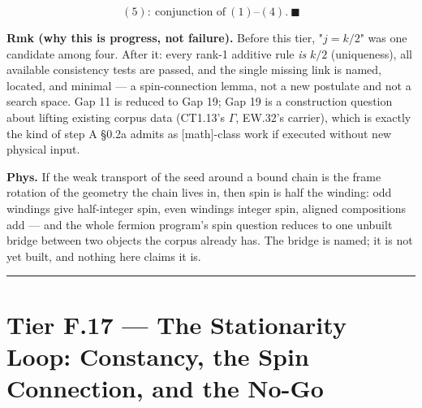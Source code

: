 \begin{theorem}
\[
(5):\ \text{conjunction of}\ (1)\text{--}(4).\ \blacksquare
\]

\textbf{Rmk (why this is progress, not failure).} Before this tier, "$j=k/2$" was one candidate among four. After it: every rank-1 additive rule \textit{is} $k/2$ (uniqueness), all available consistency tests are passed, and the single missing link is named, located, and minimal — a spin-connection lemma, not a new postulate and not a search space. Gap 11 is reduced to Gap 19; Gap 19 is a construction question about lifting existing corpus data (CT1.13's $\Gamma$, EW.32's carrier), which is exactly the kind of step A §0.2a admits as [math]-class work if executed without new physical input.

\textbf{Phys.} If the weak transport of the seed around a bound chain is the frame rotation of the geometry the chain lives in, then spin is half the winding: odd windings give half-integer spin, even windings integer spin, aligned compositions add — and the whole fermion program's spin question reduces to one unbuilt bridge between two objects the corpus already has. The bridge is named; it is not yet built, and nothing here claims it is.

\vspace{2pt}\noindent\rule{\textwidth}{0.4pt}\vspace{2pt}

\end{theorem}

\section[Tier F.17 — The Stationarity Loop: Constancy, the Spin…]{\texorpdfstring{Tier F.17 — The Stationarity Loop: Constancy, the Spin Connection, and the No-Go}{Tier F.17 - The Stationarity Loop: Constancy, the Spin Connection, and the No-Go}}

